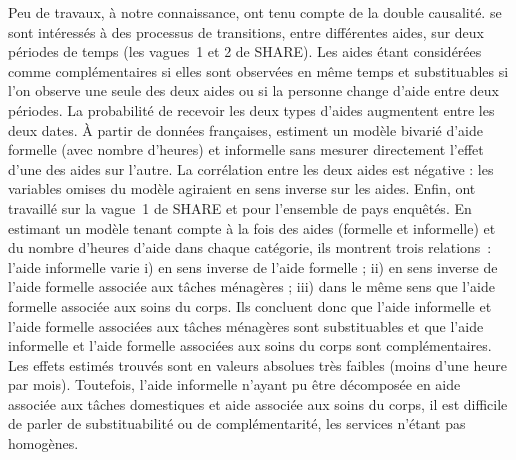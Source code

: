 \begin{Article}
\begin{refsection}[Bonnal]
Peu de travaux, à notre connaissance, ont tenu compte de la double causalité. \textcite{GEERTS2012} se sont intéressés à des processus de transitions, entre différentes aides, sur deux périodes de temps (les vagues~1 et 2 de SHARE). Les aides étant considérées comme complémentaires si elles sont observées en même temps et substituables si l’on observe une seule des deux aides ou si la personne change d’aide entre deux périodes. La probabilité de recevoir les deux types d’aides augmentent entre les deux dates. À partir de données françaises, \textcite{BARNAY2016} estiment un modèle bivarié d’aide formelle (avec nombre d'heures) et informelle sans mesurer directement l’effet d’une des aides sur l’autre. La corrélation entre les deux aides est négative : les variables omises du modèle agiraient en sens inverse sur les aides. Enfin, \textcite{BALIA2014} ont travaillé sur la vague~1 de SHARE et pour l’ensemble de pays enquêtés. En estimant un modèle tenant compte à la fois des aides (formelle et informelle) et du nombre d’heures d’aide dans chaque catégorie, ils montrent trois relations~: l’aide informelle varie i) en sens inverse de l’aide formelle ; ii) en sens inverse de l’aide formelle associée aux tâches ménagères ; iii) dans le même sens que l’aide formelle associée aux soins du corps. Ils concluent donc que l'aide informelle et l'aide formelle associées aux tâches ménagères sont substituables et que l'aide informelle et l'aide formelle associées aux soins du corps sont complémentaires. Les effets estimés trouvés sont en valeurs absolues très faibles (moins d'une heure par mois). Toutefois, l'aide informelle n'ayant pu être décomposée en aide associée aux tâches domestiques et aide associée aux soins du corps, il est difficile de parler de substituabilité ou de complémentarité, les services n'étant pas homogènes.

\end{refsection}
\end{Article}
